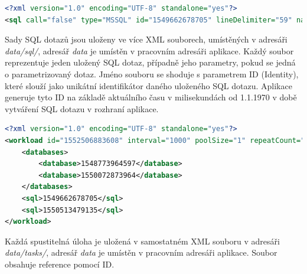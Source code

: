 \documentclass[czech,bachelor,public,dept460,male,cpdeclaration,twoside]{diploma}
\begin{document}
\lstset{aboveskip=30pt}

\begin{minipage}{\linewidth}
\begin{lstlisting}[caption=SQL dotazy s parametry ve formátu XML\label{lst:set},language=XML] 
<?xml version="1.0" encoding="UTF-8" standalone="yes"?>
<sql call="false" type="MSSQL" id="1549662678705" lineDelimiter="59" name="MujSelect" paramDelimiter="44" parametrized="true" query="true" text="select * from test;" timeout="100" update="false"/>
\end{lstlisting}
Sady SQL dotazů jsou uloženy ve více XML souborech, umístěných v adresáři \textit{data/sql/}, adresář \textit{data} je umístěn v pracovním adresáři aplikace. Každý soubor reprezentuje jeden uložený SQL dotaz, případně jeho parametry, pokud se jedná o parametrizovaný dotaz. Jméno souboru se shoduje s parametrem ID (Identity), které slouží jako unikátní identifikátor daného uloženého SQL dotazu. Aplikace generuje tyto ID na základě aktuálního času v milisekundách od 1.1.1970 v době vytváření SQL dotazu v rozhraní aplikace.
\end{minipage}

\lstset{aboveskip=30pt}

\begin{minipage}{\linewidth}
\begin{lstlisting}[caption=Spustitelná úloha ve formátu XML\label{lst:task},language=XML] 
<?xml version="1.0" encoding="UTF-8" standalone="yes"?>
<workload id="1552506883608" interval="1000" poolSize="1" repeatCount="-1" taskName="SuperTest">
    <databases>
        <database>1548773964597</database>
        <database>1550072873964</database>
    </databases>
    <sql>1549662678705</sql>
    <sql>1550513479135</sql>
</workload>
\end{lstlisting}
Každá spustitelná úloha je uložená v samostatném XML souboru v adresáři \textit{data/tasks/}, adresář \textit{data} je umístěn v pracovním adresáři aplikace. Soubor obsahuje reference pomocí ID.
\end{minipage}
\end{document}
